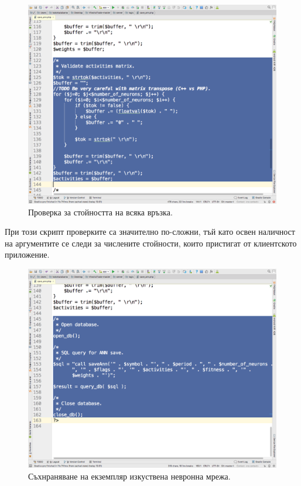 \documentclass[book,14pt,oneside,openany]{memoir}
\begin{document}
\begin{figure}[h]
  \centering
  \includegraphics[height=0.45\pdfpageheight]{pic0146}
  \caption{Проверка за стойността на всяка връзка.}
\label{fig:pic0146}
\end{figure}
\FloatBarrier

При този скрипт проверките са значително по-сложни, тъй като освен наличност на аргументите се следи за числените стойности, които пристигат от клиентското приложение. 

\begin{figure}[h]
  \centering
  \includegraphics[height=0.45\pdfpageheight]{pic0147}
  \caption{Съхнраняване на екземпляр изкуствена невронна мрежа.}
\label{fig:pic0147}
\end{figure}
\FloatBarrier
\end{document}
